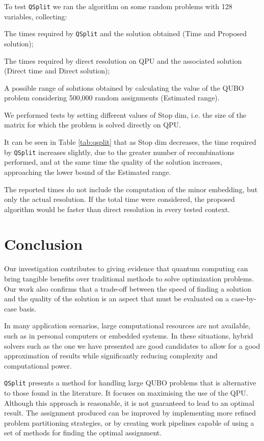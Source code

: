 \documentclass{ceurart}
\begin{document}
To test \verb|QSplit| we ran the algorithm on some random problems with 128 variables, collecting:
\begin{enumerate*}[label=\arabic*)]
    \item The times required by \verb|QSplit| and the solution obtained (Time and Proposed solution);
    \item The times required by direct resolution on QPU and the associated solution (Direct time and Direct solution);
    \item A possible range of solutions obtained by calculating the value of the QUBO problem considering 500,000 random assignments (Estimated range).
\end{enumerate*}
We performed tests by setting different values of Stop dim, i.e. the size of the matrix for which the problem is solved directly on QPU.

It can be seen in Table \ref{tab:qsplit} that as Stop dim decreases, the time required by \verb|QSplit| increases slightly, due to the greater number of recombinations performed, and at the same time the quality of the solution increases, approaching the lower bound of the Estimated range.

The reported times do not include the computation of the minor embedding, but only the actual resolution. If the total time were considered, the proposed algorithm would be faster than direct resolution in every tested context.

\section{Conclusion}

Our investigation contributes to giving evidence that quantum computing can bring tangible benefits over traditional methods to solve optimization problems. Our work also confirms that a trade-off between the speed of finding a solution and the quality of the solution is an aspect that must be evaluated on a case-by-case basis.

In many application scenarios, large computational resources are not available, such as in personal computers or embedded systems. In these situations, hybrid solvers such as the one we have presented are good candidates to allow for a good approximation of results while significantly reducing complexity and computational power.

\verb|QSplit| presents a method for handling large QUBO problems that is alternative to those found in the literature\cite{subqubo1}\cite{subqubo2}. It focuses on maximising the use of the QPU. Although this approach is reasonable, it is not guaranteed to lead to an optimal result. The assignment produced can be improved by implementing more refined problem partitioning strategies\cite{bnb}, or by creating work pipelines capable of using a set of methods for finding the optimal assignment\cite{dwavehybrid}.


\end{document}
